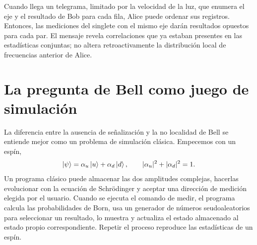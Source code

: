 Cuando llega un telegrama, limitado por la velocidad de la luz, que enumera el eje y el resultado de Bob para cada fila, Alice puede ordenar sus registros. Entonces, las mediciones del singlete con el mismo eje darán resultados opuestos para cada par. El mensaje revela correlaciones que ya estaban presentes en las estadísticas conjuntas; no altera retroactivamente la distribución local de frecuencias anterior de Alice.

\begin{classroomqa}
\end{classroomqa}

\begin{classroomqa}
\end{classroomqa}

\section{La pregunta de Bell como juego de simulación}

La diferencia entre la ausencia de señalización y la no localidad de Bell se entiende mejor como un problema de simulación clásica. Empecemos con un espín,
\begin{equation}
\left\lvert\psi\right\rangle=\alpha_u\left\lvert u\right\rangle+\alpha_d\left\lvert d\right\rangle,
\qquad
|\alpha_u|^2+|\alpha_d|^2=1.
\end{equation}
Un programa clásico puede almacenar las dos amplitudes complejas, hacerlas evolucionar con la ecuación de Schr\"odinger y aceptar una dirección de medición elegida por el usuario. Cuando se ejecuta el comando de medir, el programa calcula las probabilidades de Born, usa un generador de números seudoaleatorios para seleccionar un resultado, lo muestra y actualiza el estado almacenado al estado propio correspondiente. Repetir el proceso reproduce las estadísticas de un espín.

